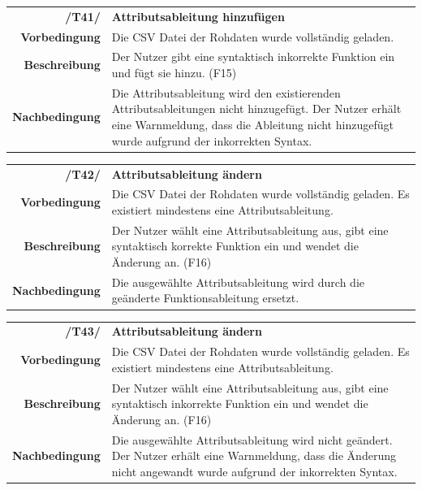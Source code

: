 \documentclass{article}
\begin{document}
\begin{table}[H]
\begin{tabularx}{\textwidth}{rX}
\textbf{/T41/}         & \textbf{Attributsableitung hinzufügen} \\
\textbf{Vorbedingung}  & Die CSV Datei der Rohdaten wurde vollständig geladen.   \\
\textbf{Beschreibung}  & Der Nutzer gibt eine syntaktisch inkorrekte Funktion ein und fügt sie hinzu. (F15) \\
\textbf{Nachbedingung} & Die Attributsableitung wird den existierenden Attributsableitungen nicht hinzugefügt. Der Nutzer erhält eine Warnmeldung, dass die Ableitung nicht hinzugefügt wurde aufgrund der inkorrekten Syntax.
\end{tabularx}
\end{table}

\begin{table}[H]
\begin{tabularx}{\textwidth}{rX}
\textbf{/T42/}         & \textbf{Attributsableitung ändern} \\
\textbf{Vorbedingung}  & Die CSV Datei der Rohdaten wurde vollständig geladen. Es existiert mindestens eine Attributsableitung.  \\
\textbf{Beschreibung}  & Der Nutzer wählt eine Attributsableitung aus, gibt eine syntaktisch korrekte Funktion ein und wendet die Änderung an. (F16) \\
\textbf{Nachbedingung} & Die ausgewählte Attributsableitung wird durch die geänderte Funktionsableitung ersetzt.
\end{tabularx}
\end{table}

\begin{table}[H]
\begin{tabularx}{\textwidth}{rX}
\textbf{/T43/}         & \textbf{Attributsableitung ändern} \\
\textbf{Vorbedingung}  & Die CSV Datei der Rohdaten wurde vollständig geladen. Es existiert mindestens eine Attributsableitung.   \\
\textbf{Beschreibung}  & Der Nutzer wählt eine Attributsableitung aus, gibt eine syntaktisch inkorrekte Funktion ein und wendet die Änderung an. (F16) \\
\textbf{Nachbedingung} & Die ausgewählte Attributsableitung wird nicht geändert. Der Nutzer erhält eine Warnmeldung, dass die Änderung nicht angewandt wurde aufgrund der inkorrekten Syntax.
\end{tabularx}
\end{table}
\end{document}
